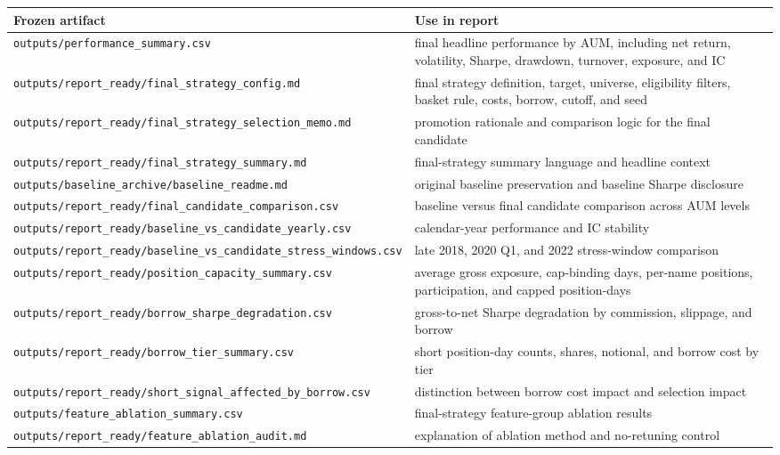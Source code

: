 \documentclass[
]{article}
\begin{document}
\begin{longtable}[]{@{}ll@{}}
\toprule
Frozen artifact & Use in report \\
\midrule
\endhead
\texttt{outputs/performance\_summary.csv} & final headline performance
by AUM, including net return, volatility, Sharpe, drawdown, turnover,
exposure, and IC \\
\texttt{outputs/report\_ready/final\_strategy\_config.md} & final
strategy definition, target, universe, eligibility filters, basket rule,
costs, borrow, cutoff, and seed \\
\texttt{outputs/report\_ready/final\_strategy\_selection\_memo.md} &
promotion rationale and comparison logic for the final candidate \\
\texttt{outputs/report\_ready/final\_strategy\_summary.md} &
final-strategy summary language and headline context \\
\texttt{outputs/baseline\_archive/baseline\_readme.md} & original
baseline preservation and baseline Sharpe disclosure \\
\texttt{outputs/report\_ready/final\_candidate\_comparison.csv} &
baseline versus final candidate comparison across AUM levels \\
\texttt{outputs/report\_ready/baseline\_vs\_candidate\_yearly.csv} &
calendar-year performance and IC stability \\
\texttt{outputs/report\_ready/baseline\_vs\_candidate\_stress\_windows.csv}
& late 2018, 2020 Q1, and 2022 stress-window comparison \\
\texttt{outputs/report\_ready/position\_capacity\_summary.csv} & average
gross exposure, cap-binding days, per-name positions, participation, and
capped position-days \\
\texttt{outputs/report\_ready/borrow\_sharpe\_degradation.csv} &
gross-to-net Sharpe degradation by commission, slippage, and borrow \\
\texttt{outputs/report\_ready/borrow\_tier\_summary.csv} & short
position-day counts, shares, notional, and borrow cost by tier \\
\texttt{outputs/report\_ready/short\_signal\_affected\_by\_borrow.csv} &
distinction between borrow cost impact and selection impact \\
\texttt{outputs/feature\_ablation\_summary.csv} & final-strategy
feature-group ablation results \\
\texttt{outputs/report\_ready/feature\_ablation\_audit.md} & explanation
of ablation method and no-retuning control \\

\end{longtable}
\end{document}
